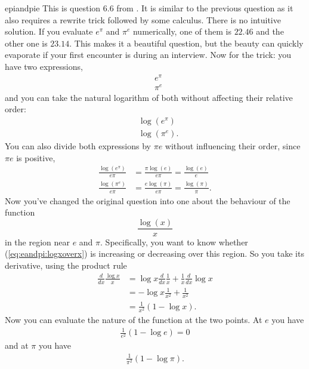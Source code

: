 \begin{answer}{epiandpie}
This is question 6.6 from \citet{JoshiQA}.
It is similar to the previous question as it also requires a rewrite trick followed by some calculus.
There is no intuitive solution.
If you evaluate
$e^\pi$
and
$\pi^e$
numerically, one of them is
$22.46$
and the other one is
$23.14$.
This makes it a beautiful question, but the beauty can quickly evaporate if your first encounter is during an interview.
Now for the trick: you have two expressions,
\begin{align*}
&
e^\pi
\\
&
\pi^e
\end{align*}
and you can take the natural logarithm of both without affecting their relative order:
\begin{align*}
&
\log(e^\pi)
\\
&
\log(\pi^e)
\text{.}
\end{align*}
You can also divide both expressions by $\pi e$ without influencing their order, since $\pi e$ is positive,
\begin{align*}
\frac{\log(e^\pi)}{e \pi}
&=
\frac{\pi\log(e)}{e \pi}
=
\frac{\log(e)}{e}
\\
\frac{\log(\pi^e)}{e \pi}
&=
\frac{e \log(\pi)}{e \pi}
=
\frac{\log(\pi)}{\pi}
\text{.}
\end{align*}
Now you've changed the original question into one about the behaviour of the function
\begin{equation}
\label{eq:eandpi:logxoverx}
\frac{\log(x)}{x}
\end{equation}
in the region near $e$ and $\pi$.
Specifically, you want to know whether (\ref{eq:eandpi:logxoverx}) is increasing or decreasing over this region.
So you take its derivative, using the product rule
\begin{align*}
\frac{d}{dx}
\frac{\log{x}}{x}
 &=
\log x
\frac{d}{dx}
\frac{1}{x}
+
\frac{1}{x}
\frac{d}{dx}
\log{x}
\\
 &=
 -
\log x
\frac{1}{x^2}
+
\frac{1}{x^2}
\\
 &=
\frac{1}{x^2}
\left(
1 - \log x
\right)
\text{.}
\end{align*}
Now you can evaluate the nature of the function at the two points.
At $e$ you have
\begin{align*}
\frac{1}{e^2}
\left(
1 - \log e
\right)
=0
\end{align*}
and at $\pi$ you have
\begin{align*}
\frac{1}{\pi^2}
\left(
1 - \log \pi
\right)
\text{.}
\end{align*}

\end{answer}
